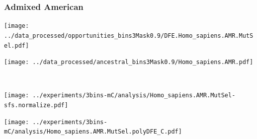 \subsubsection{Admixed American}

\begin{minipage}{0.49\linewidth}
    \texttt{[image: ../data\_processed/opportunities\_bins3Mask0.9/DFE.Homo\_sapiens.AMR.MutSel.pdf]}
\end{minipage}
\begin{minipage}{0.49\linewidth}
    \texttt{[image: ../data\_processed/ancestral\_bins3Mask0.9/Homo\_sapiens.AMR.pdf]}
\end{minipage}
\\
\begin{minipage}{0.49\linewidth}
    \texttt{[image: ../experiments/3bins-mC/analysis/Homo\_sapiens.AMR.MutSel-sfs.normalize.pdf]}
\end{minipage}
\begin{minipage}{0.4\linewidth}
    \texttt{[image: ../experiments/3bins-mC/analysis/Homo\_sapiens.AMR.MutSel.polyDFE\_C.pdf]}
\end{minipage}
